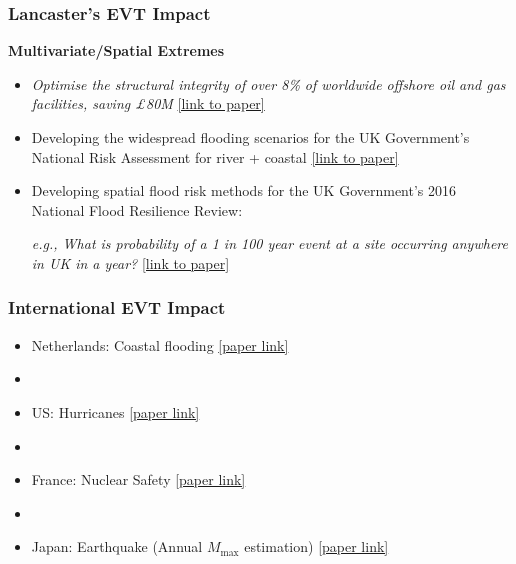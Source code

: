 \begin{frame}

\frametitle{ Lancaster’s EVT Impact}

{\bf Multivariate/Spatial Extremes}

\begin{itemize}

\item

{\it Optimise the structural integrity of over 8\% of worldwide offshore oil and gas facilities, saving \pounds 80M} \href{https://www.sciencedirect.com/science/article/pii/S002980181930784X}{[link to paper]}

\item

Developing the widespread flooding scenarios for the UK Government's National Risk Assessment for river + coastal \href{https://www.sciencedirect.com/science/article/pii/S0029801817305048}{[link to paper]} 


\item

Developing spatial flood risk methods for the UK Government's 2016 National Flood Resilience Review:

{\it e.g., What is probability of a 1 in 100 year event at a site occurring anywhere in UK in a year?} \href{https://www.sciencedirect.com/science/article/pii/S2211675317302786}{[link to paper]}
\end{itemize}
\end{frame} 

\begin{frame}
\frametitle{International EVT Impact}
\begin{itemize}
\item Netherlands: Coastal flooding \href{https://www.sciencedirect.com/science/article/pii/S0378383913002159}{[paper link]}
\item []
\item US: Hurricanes \href{https://agupubs.onlinelibrary.wiley.com/doi/full/10.1029/2019GL086138}{[paper link]}
\item []
\item France: Nuclear Safety \href{https://asmedigitalcollection.asme.org/ICONE/proceedings-abstract/ICONE2020/V002T08A022/1088613}{[paper link]}
\item []
\item Japan: Earthquake (Annual $M_{\text{max}}$ estimation)  \href{https://www.scirp.org/journal/paperinformation.aspx?paperid=106047}{[paper link]}
\end{itemize}
\end{frame} 

